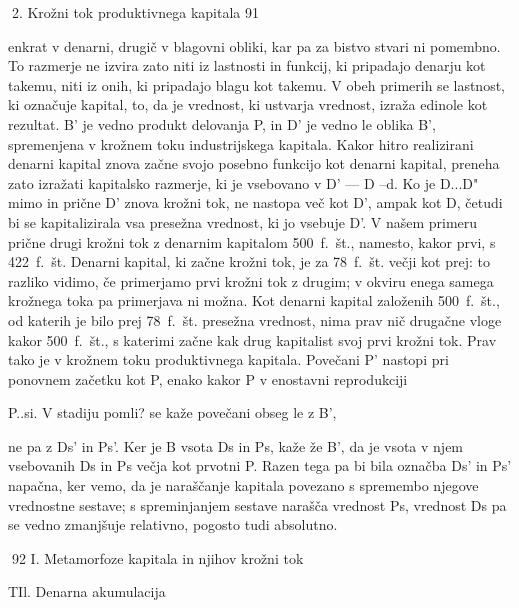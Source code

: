 \documentclass[kapital_02.tex]{subfiles}
\begin{document}
2. Krožni tok produktivnega kapitala 91



 enkrat v denarni, drugič v blagovni obliki, kar pa za bistvo stvari ni pomembno. To razmerje ne izvira zato niti iz lastnosti in funkcij, ki pripadajo denarju kot takemu, niti iz onih, ki pripadajo blagu kot takemu. V obeh primerih se lastnost, ki označuje kapital, to, da je vrednost, ki ustvarja vrednost, izraža edinole kot rezultat. B' je vedno produkt delovanja P, in D' je vedno le oblika B', spremenjena v krožnem toku industrijskega kapitala. Kakor hitro realizirani denarni kapital znova začne svojo posebno funkcijo kot denarni kapital, preneha zato izražati kapitalsko razmerje, ki je vsebovano v D' — D --d. Ko je D...D" mimo in prične D' znova krožni tok, ne nastopa več kot D', ampak kot D, četudi bi se kapitalizirala vsa presežna vrednost, ki jo vsebuje D'. V našem primeru prične drugi krožni tok z denarnim kapitalom 500~f.~št., namesto, kakor prvi, s 422~f.~št. Denarni kapital, ki začne krožni tok, je za 78~f.~št. večji kot prej: to razliko vidimo, če primerjamo prvi krožni tok z drugim; v okviru enega samega krožnega toka pa primerjava ni možna. Kot denarni kapital založenih 500~f.~št., od katerih je bilo prej 78~f.~št. presežna vrednost, nima prav nič drugačne vloge kakor 500~f.~št., s katerimi začne kak drug kapitalist svoj prvi krožni tok. Prav tako je v krožnem toku produktivnega kapitala. Povečani P' nastopi pri ponovnem začetku kot P, enako kakor P v enostavni reprodukciji

P..si. V stadiju pomli? se kaže povečani obseg le z B',

ne pa z Ds' in Ps'. Ker je B vsota Ds in Ps, kaže že B', da je vsota v njem vsebovanih Ds in Ps večja kot prvotni P. Razen tega pa bi bila označba Ds' in Ps' napačna, ker vemo, da je naraščanje kapitala povezano s spremembo njegove vrednostne sestave; s spreminjanjem sestave narašča vrednost Ps, vrednost Ds pa se vedno zmanjšuje relativno, pogosto tudi absolutno.



92 I. Metamorfoze kapitala in njihov krožni tok



 TIl. Denarna akumulacija
\end{document}
